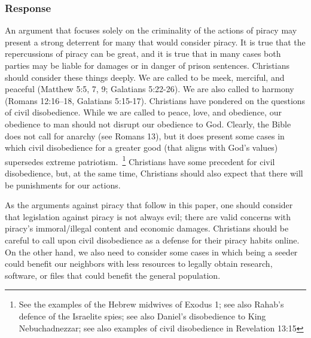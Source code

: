 \documentclass[onecolumn, 12pt]{article}
\begin{document}
\begin{refsection}
\subsubsection{Response}
An argument that focuses solely on the criminality of the actions of piracy
may present a strong deterrent for many that would consider piracy. It is true
that the repercussions of piracy can be great, and it is true that in many
cases both parties may be liable for damages or in danger of prison sentences.
Christians should consider these things deeply. We are called to be meek,
merciful, and peaceful (Matthew 5:5, 7, 9; Galatians 5:22-26). We are also
called to harmony (Romans 12:16--18, Galatians 5:15-17). Christians have
pondered on the questions of civil disobedience. While we are called to peace,
love, and obedience, our obedience to man should not disrupt our obedience to
God. Clearly, the Bible does not call for anarchy (see Romans 13), but it
does present some cases in which civil disobedience for a greater good (that
aligns with God's values) supersedes extreme patriotism.~\footnote{%
  See the examples of the Hebrew midwives of Exodus 1; see also Rahab's defence
  of the Israelite spies; see also Daniel's disobedience to King
  Nebuchadnezzar; see also examples of civil disobedience in Revelation 13:15%
} Christians have some precedent for civil disobedience, but, at the same time,
Christians should also expect that there will be punishments for our actions.

As the arguments against piracy that follow in this paper, one should consider
that legislation against piracy is not always evil; there are valid concerns
with piracy's immoral/illegal content and economic damages. Christians should
be careful to call upon civil disobedience as a defense for their piracy habits
online. On the other hand, we also need to consider some cases in which being
a seeder could benefit our neighbors with less resources to legally obtain
research, software, or files that could benefit the general population.


\end{refsection}
\end{document}
